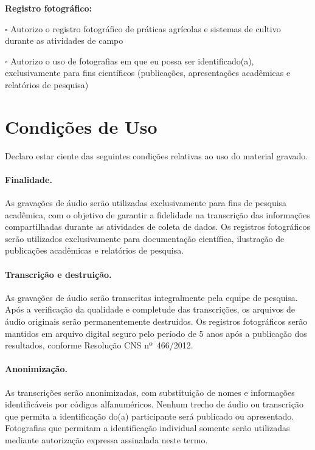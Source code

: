 \documentclass[12pt,a4paper,brazil]{article}
\begin{document}
\vspace{0.3cm}

\noindent\textbf{Registro fotográfico:}

\noindent
$\square$ Autorizo o registro fotográfico de práticas agrícolas e sistemas de cultivo durante as atividades de campo

\noindent
$\square$ Autorizo o uso de fotografias em que eu possa ser identificado(a), exclusivamente para fins científicos (publicações, apresentações acadêmicas e relatórios de pesquisa)

\vspace{0.5cm}

\section*{Condições de Uso}

Declaro estar ciente das seguintes condições relativas ao uso do material gravado.

\paragraph{Finalidade.} As gravações de áudio serão utilizadas exclusivamente para fins de pesquisa acadêmica, com o objetivo de garantir a fidelidade na transcrição das informações compartilhadas durante as atividades de coleta de dados. Os registros fotográficos serão utilizados exclusivamente para documentação científica, ilustração de publicações acadêmicas e relatórios de pesquisa.

\paragraph{Transcrição e destruição.} As gravações de áudio serão transcritas integralmente pela equipe de pesquisa. Após a verificação da qualidade e completude das transcrições, os arquivos de áudio originais serão permanentemente destruídos. Os registros fotográficos serão mantidos em arquivo digital seguro pelo período de 5 anos após a publicação dos resultados, conforme Resolução CNS nº~466/2012.

\paragraph{Anonimização.} As transcrições serão anonimizadas, com substituição de nomes e informações identificáveis por códigos alfanuméricos. Nenhum trecho de áudio ou transcrição que permita a identificação do(a) participante será publicado ou apresentado. Fotografias que permitam a identificação individual somente serão utilizadas mediante autorização expressa assinalada neste termo.
\end{document}
